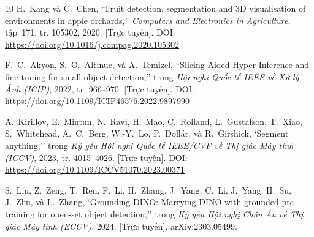 \documentclass[12pt,a4paper]{article}
\begin{document}
\begin{thebibliography}{10}
H.~Kang và C.~Chen, ``Fruit detection, segmentation and 3D visualisation of environments in apple orchards,'' \textit{Computers and Electronics in Agriculture}, tập~171, tr. 105302, 2020. [Trực tuyến]. DOI: \url{https://doi.org/10.1016/j.compag.2020.105302}

F.~C.~Akyon, S.~O.~Altinuc, và A.~Temizel, ``Slicing Aided Hyper Inference and fine-tuning for small object detection,'' trong \textit{Hội nghị Quốc tế IEEE về Xử lý Ảnh (ICIP)}, 2022, tr. 966--970. [Trực tuyến]. DOI: \url{https://doi.org/10.1109/ICIP46576.2022.9897990}

A.~Kirillov, E.~Mintun, N.~Ravi, H.~Mao, C.~Rolland, L.~Gustafson, T.~Xiao, S.~Whitehead, A.~C.~Berg, W.-Y.~Lo, P.~Doll{\'a}r, và R.~Girshick, `Segment anything,'' trong \textit{Kỷ yếu Hội nghị Quốc tế IEEE/CVF về Thị giác Máy tính (ICCV)}, 2023, tr. 4015--4026. [Trực tuyến]. DOI: \url{https://doi.org/10.1109/ICCV51070.2023.00371}

S.~Liu, Z.~Zeng, T.~Ren, F.~Li, H.~Zhang, J.~Yang, C.~Li, J.~Yang, H.~Su, J.~Zhu, và L.~Zhang, `Grounding DINO: Marrying DINO with grounded pre-training for open-set object detection,'' trong \textit{Kỷ yếu Hội nghị Châu Âu về Thị giác Máy tính (ECCV)}, 2024. [Trực tuyến]. arXiv:2303.05499.
\end{thebibliography}
\end{document}
